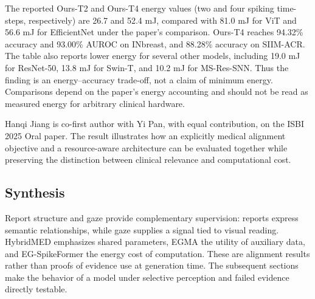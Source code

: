 The reported Ours-T2 and Ours-T4 energy values (two and four spiking time-steps, respectively) are 26.7 and 52.4 mJ, compared with 81.0 mJ for ViT and 56.6 mJ for EfficientNet under the paper's comparison. Ours-T4 reaches 94.32\% accuracy and 93.00\% AUROC on INbreast, and 88.28\% accuracy on SIIM-ACR. The table also reports lower energy for several other models, including 19.0 mJ for ResNet-50, 13.8 mJ for Swin-T, and 10.2 mJ for MS-Res-SNN. Thus the finding is an energy--accuracy trade-off, not a claim of minimum energy. Comparisons depend on the paper's energy accounting and should not be read as measured energy for arbitrary clinical hardware.

Hanqi Jiang is co-first author with Yi Pan, with equal contribution, on the ISBI 2025 Oral paper. The result illustrates how an explicitly medical alignment objective and a resource-aware architecture can be evaluated together while preserving the distinction between clinical relevance and computational cost.

\subsection{Synthesis}
Report structure and gaze provide complementary supervision: reports express semantic relationships, while gaze supplies a signal tied to visual reading. HybridMED emphasizes shared parameters, EGMA the utility of auxiliary data, and EG-SpikeFormer the energy cost of computation. These are alignment results rather than proofs of evidence use at generation time. The subsequent sections make the behavior of a model under selective perception and failed evidence directly testable.
